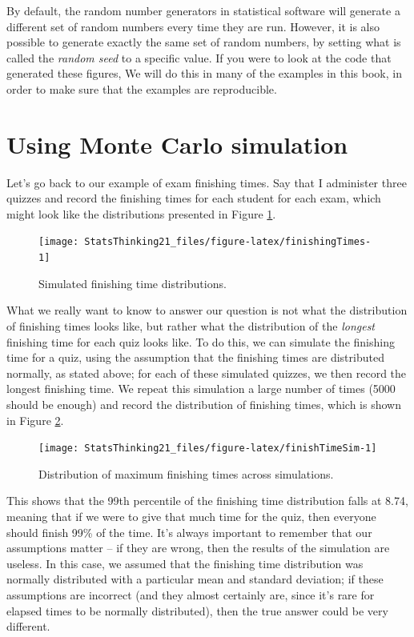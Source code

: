 \documentclass[
  12pt,
]{book}
\begin{document}
By default, the random number generators in statistical software will generate a different set of random numbers every time they are run. However, it is also possible to generate exactly the same set of random numbers, by setting what is called the \emph{random seed} to a specific value. If you were to look at the code that generated these figures, We will do this in many of the examples in this book, in order to make sure that the examples are reproducible.

\hypertarget{using-monte-carlo-simulation}{%
\section{Using Monte Carlo simulation}\label{using-monte-carlo-simulation}}

Let's go back to our example of exam finishing times. Say that I administer three quizzes and record the finishing times for each student for each exam, which might look like the distributions presented in Figure \ref{fig:finishingTimes}.

\begin{figure}
\texttt{[image: StatsThinking21\_files/figure-latex/finishingTimes-1]} \caption{Simulated finishing time distributions.}\label{fig:finishingTimes}
\end{figure}

What we really want to know to answer our question is not what the distribution of finishing times looks like, but rather what the distribution of the \emph{longest} finishing time for each quiz looks like. To do this, we can simulate the finishing time for a quiz, using the assumption that the finishing times are distributed normally, as stated above; for each of these simulated quizzes, we then record the longest finishing time. We repeat this simulation a large number of times (5000 should be enough) and record the distribution of finishing times, which is shown in Figure \ref{fig:finishTimeSim}.

\begin{figure}
\texttt{[image: StatsThinking21\_files/figure-latex/finishTimeSim-1]} \caption{Distribution of maximum finishing times across simulations.}\label{fig:finishTimeSim}
\end{figure}

This shows that the 99th percentile of the finishing time distribution falls at 8.74, meaning that if we were to give that much time for the quiz, then everyone should finish 99\% of the time. It's always important to remember that our assumptions matter -- if they are wrong, then the results of the simulation are useless. In this case, we assumed that the finishing time distribution was normally distributed with a particular mean and standard deviation; if these assumptions are incorrect (and they almost certainly are, since it's rare for elapsed times to be normally distributed), then the true answer could be very different.
\end{document}
